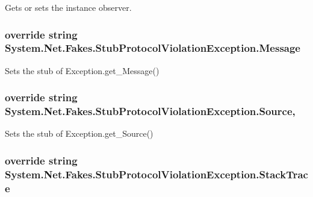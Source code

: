 Gets or sets the instance observer.

\hypertarget{class_system_1_1_net_1_1_fakes_1_1_stub_protocol_violation_exception_a6a1bd1931d87ff0313f81ee51e74a7ff}{
\subsubsection[{Message}]{\setlength{\rightskip}{0pt plus 5cm}override string System.\-Net.\-Fakes.\-Stub\-Protocol\-Violation\-Exception.\-Message\hspace{0.3cm}{\ttfamily [get]}}}\label{class_system_1_1_net_1_1_fakes_1_1_stub_protocol_violation_exception_a6a1bd1931d87ff0313f81ee51e74a7ff}


Sets the stub of Exception.\-get\-\_\-\-Message()

\hypertarget{class_system_1_1_net_1_1_fakes_1_1_stub_protocol_violation_exception_ad0f093a450534d5f90af6f1aa61cbae1}{
\subsubsection[{Source}]{\setlength{\rightskip}{0pt plus 5cm}override string System.\-Net.\-Fakes.\-Stub\-Protocol\-Violation\-Exception.\-Source\hspace{0.3cm}{\ttfamily [get]}, {\ttfamily [set]}}}\label{class_system_1_1_net_1_1_fakes_1_1_stub_protocol_violation_exception_ad0f093a450534d5f90af6f1aa61cbae1}


Sets the stub of Exception.\-get\-\_\-\-Source()

\hypertarget{class_system_1_1_net_1_1_fakes_1_1_stub_protocol_violation_exception_a551613f75f8677331560af99837708aa}{
\subsubsection[{Stack\-Trace}]{\setlength{\rightskip}{0pt plus 5cm}override string System.\-Net.\-Fakes.\-Stub\-Protocol\-Violation\-Exception.\-Stack\-Trace\hspace{0.3cm}{\ttfamily [get]}}}\label{class_system_1_1_net_1_1_fakes_1_1_stub_protocol_violation_exception_a551613f75f8677331560af99837708aa}


